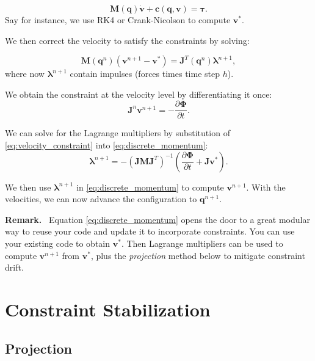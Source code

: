 \documentclass{article}
\newcommand{\mf}[1]{{\mathbf{#1}}}
\newenvironment{remark}{\begin{remarkbox}\textbf{Remark.}~}{\end{remarkbox}}
\begin{document}
\begin{equation}
    \mf{M}(\mf{q}) \dot{\mf{v}} + \mf{c}(\mf{q}, \mf{v}) = \bm{\tau}.
\end{equation}
Say for instance, we use RK4 or Crank-Nicolson to compute $\mf{v}^*$.

We then correct the velocity to satisfy the constraints by solving:

\begin{equation}
    \mf{M}(\mf{q}^n)(\mf{v}^{n+1} - \mf{v}^*) = \mf{J}^T(\mf{q}^n) \mf{\lambda}^{n+1},
    \label{eq:discrete_momentum}
\end{equation}
where now $\mf{\lambda}^{n+1}$ contain impulses (forces times time step $h$).

We obtain the constraint at the velocity level by differentiating it once:
\begin{equation}
    \mf{J}^n\mf{v}^{n+1} = -\frac{\partial\mf{\Phi}}{\partial t}.
    \label{eq:velocity_constraint}
\end{equation}

We can solve for the Lagrange multipliers by substitution of
\eqref{eq:velocity_constraint} into \eqref{eq:discrete_momentum}:
\begin{equation}
    \mf{\lambda}^{n+1} = -(\mf{J}\mf{M}\mf{J}^T)^{-1}(\frac{\partial\mf{\Phi}}{\partial t} + \mf{J}\mf{v}^*).
\end{equation}

We then use $\mf{\lambda}^{n+1}$ in \eqref{eq:discrete_momentum} to compute
${\mf{v}}^{n+1}$. With the velocities, we can now advance the configuration to
${\mf{q}}^{n+1}$.

\begin{remark}
 Equation \eqref{eq:discrete_momentum} opens the door to a great modular way to
 reuse your code and update it to incorporate constraints. You can use your
 existing code to obtain $\mf{v}^*$. Then Lagrange multipliers can be used to
 compute $\mf{v}^{n+1}$ from $\mf{v}^*$, plus the \emph{projection} method below
 to mitigate constraint drift.
 \end{remark}

\section{Constraint Stabilization}

\subsection{Projection}
\end{document}
